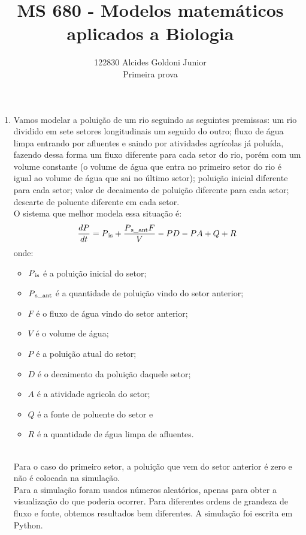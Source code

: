 \documentclass[a4paper]{article}
\title{MS 680 - Modelos matem\'{a}ticos aplicados a Biologia}
\author{122830 Alcides Goldoni Junior\\
  \Small Primeira prova \\
}%
\begin{document}
\maketitle
\newpage
\begin{enumerate}
\item
Vamos modelar a polui\c{c}\~ao de um rio seguindo as seguintes premissas: um rio dividido em sete setores longitudinais um seguido do outro; fluxo de \'agua limpa entrando por afluentes e saindo por atividades agr\'icolas j\'a polu\'ida, fazendo dessa forma um fluxo diferente para cada setor do rio, por\'em com um volume constante (o volume de \'agua que entra no primeiro setor do rio \'e igual ao volume de \'agua que sai no \'ultimo setor); polui\c{c}\~ao inicial diferente para cada setor; valor de decaimento de polui\c{c}\~ao diferente para cada setor; descarte de poluente diferente em cada setor.
\\
O sistema que melhor modela essa situa\c{c}\~ao \'e:
\begin{equation}
\frac{dP}{dt} = P\textsubscript{is} + \frac{P\textsubscript{s\_ant}F }{V} - PD - PA + Q + R
\end{equation}
onde:
\begin{itemize}
\item$P\textsubscript{is}$ \'e a polui\c{c}\~ao inicial do setor;
\item$P\textsubscript{s\_ant}$ \'e a quantidade de polui\c{c}\~ao vindo do setor anterior;
\item$F$ \'e o fluxo de \'agua vindo do setor anterior;
\item$V$ \'e o volume de \'agua;
\item$P$ \'e a polui\c{c}\~ao atual do setor;
\item$D$ \'e o decaimento da polui\c{c}\~ao daquele setor;
\item$A$ \'e a atividade agricola do setor;
\item$Q$ \'e a fonte de poluente do setor e
\item$R$ \'e a quantidade de \'agua limpa de afluentes.
\end{itemize}
\\
Para o caso do primeiro setor, a polui\c{c}\~ao que vem do setor anterior \'e zero e n\~ao \'e colocada na simula\c{c}\~ao.
\\
Para a simula\c{c}\~ao foram usados n\'umeros aleat\'orios, apenas para obter a visualiza\c{c}\~ao do que poderia ocorrer. Para diferentes ordens de grandeza de fluxo e fonte, obtemos resultados bem diferentes. A simula\c{c}\~ao foi escrita em Python.

\end{enumerate}
\end{document}
